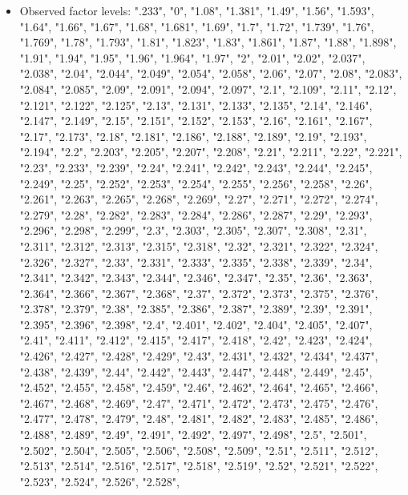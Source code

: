 \documentclass[]{article}
\providecommand{\tightlist}{%
  \setlength{\itemsep}{0pt}\setlength{\parskip}{0pt}}
\begin{document}
\begin{itemize}
\tightlist
\item
  Observed factor levels: ".233", "0", "1.08", "1.381", "1.49", "1.56",
  "1.593", "1.64", "1.66", "1.67", "1.68", "1.681", "1.69", "1.7",
  "1.72", "1.739", "1.76", "1.769", "1.78", "1.793", "1.81", "1.823",
  "1.83", "1.861", "1.87", "1.88", "1.898", "1.91", "1.94", "1.95",
  "1.96", "1.964", "1.97", "2", "2.01", "2.02", "2.037", "2.038",
  "2.04", "2.044", "2.049", "2.054", "2.058", "2.06", "2.07", "2.08",
  "2.083", "2.084", "2.085", "2.09", "2.091", "2.094", "2.097", "2.1",
  "2.109", "2.11", "2.12", "2.121", "2.122", "2.125", "2.13", "2.131",
  "2.133", "2.135", "2.14", "2.146", "2.147", "2.149", "2.15", "2.151",
  "2.152", "2.153", "2.16", "2.161", "2.167", "2.17", "2.173", "2.18",
  "2.181", "2.186", "2.188", "2.189", "2.19", "2.193", "2.194", "2.2",
  "2.203", "2.205", "2.207", "2.208", "2.21", "2.211", "2.22", "2.221",
  "2.23", "2.233", "2.239", "2.24", "2.241", "2.242", "2.243", "2.244",
  "2.245", "2.249", "2.25", "2.252", "2.253", "2.254", "2.255", "2.256",
  "2.258", "2.26", "2.261", "2.263", "2.265", "2.268", "2.269", "2.27",
  "2.271", "2.272", "2.274", "2.279", "2.28", "2.282", "2.283", "2.284",
  "2.286", "2.287", "2.29", "2.293", "2.296", "2.298", "2.299", "2.3",
  "2.303", "2.305", "2.307", "2.308", "2.31", "2.311", "2.312", "2.313",
  "2.315", "2.318", "2.32", "2.321", "2.322", "2.324", "2.326", "2.327",
  "2.33", "2.331", "2.333", "2.335", "2.338", "2.339", "2.34", "2.341",
  "2.342", "2.343", "2.344", "2.346", "2.347", "2.35", "2.36", "2.363",
  "2.364", "2.366", "2.367", "2.368", "2.37", "2.372", "2.373", "2.375",
  "2.376", "2.378", "2.379", "2.38", "2.385", "2.386", "2.387", "2.389",
  "2.39", "2.391", "2.395", "2.396", "2.398", "2.4", "2.401", "2.402",
  "2.404", "2.405", "2.407", "2.41", "2.411", "2.412", "2.415", "2.417",
  "2.418", "2.42", "2.423", "2.424", "2.426", "2.427", "2.428", "2.429",
  "2.43", "2.431", "2.432", "2.434", "2.437", "2.438", "2.439", "2.44",
  "2.442", "2.443", "2.447", "2.448", "2.449", "2.45", "2.452", "2.455",
  "2.458", "2.459", "2.46", "2.462", "2.464", "2.465", "2.466", "2.467",
  "2.468", "2.469", "2.47", "2.471", "2.472", "2.473", "2.475", "2.476",
  "2.477", "2.478", "2.479", "2.48", "2.481", "2.482", "2.483", "2.485",
  "2.486", "2.488", "2.489", "2.49", "2.491", "2.492", "2.497", "2.498",
  "2.5", "2.501", "2.502", "2.504", "2.505", "2.506", "2.508", "2.509",
  "2.51", "2.511", "2.512", "2.513", "2.514", "2.516", "2.517", "2.518",
  "2.519", "2.52", "2.521", "2.522", "2.523", "2.524", "2.526", "2.528",

\end{itemize}
\end{document}
